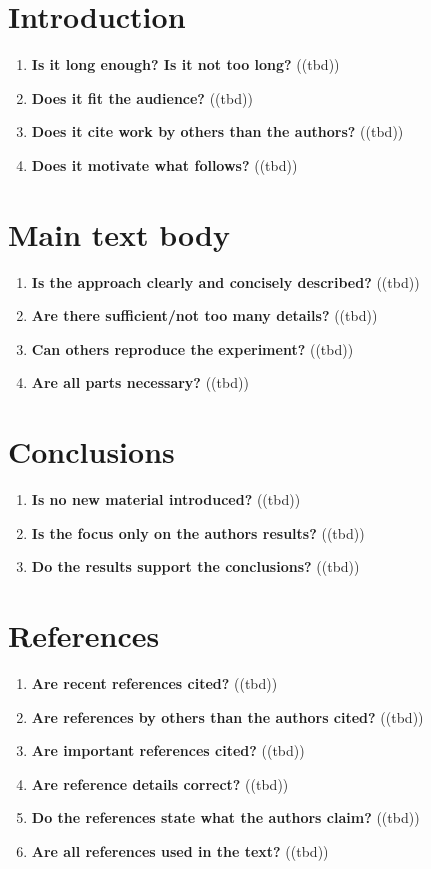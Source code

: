 \section{Introduction}\label{sec:introduction}
\begin{enumerate}[resume]
    \item \textbf{Is it long enough? Is it not too long?} ((tbd))
    \item \textbf{Does it fit the audience?} ((tbd))
    \item \textbf{Does it cite work by others than the authors?} ((tbd))
    \item \textbf{Does it motivate what follows?} ((tbd))
\end{enumerate}

\section{Main text body}\label{sec:main}
\begin{enumerate}[resume]
    \item \textbf{Is the approach clearly and concisely described?} ((tbd))
    \item \textbf{Are there sufficient/not too many details?} ((tbd))
    \item \textbf{Can others reproduce the experiment?} ((tbd))
    \item \textbf{Are all parts necessary?} ((tbd))
\end{enumerate}

\section{Conclusions}\label{sec:conclusions}
\begin{enumerate}[resume]
    \item \textbf{Is no new material introduced?} ((tbd))
    \item \textbf{Is the focus only on the authors results?} ((tbd))
    \item \textbf{Do the results support the conclusions?} ((tbd))
\end{enumerate}

\section{References}\label{sec:references}
\begin{enumerate}[resume]
    \item \textbf{Are recent references cited?} ((tbd))
    \item \textbf{Are references by others than the authors cited?} ((tbd))
    \item \textbf{Are important references cited?} ((tbd))
    \item \textbf{Are reference details correct?} ((tbd))
    \item \textbf{Do the references state what the authors claim?} ((tbd))
    \item \textbf{Are all references used in the text?} ((tbd))
\end{enumerate}

